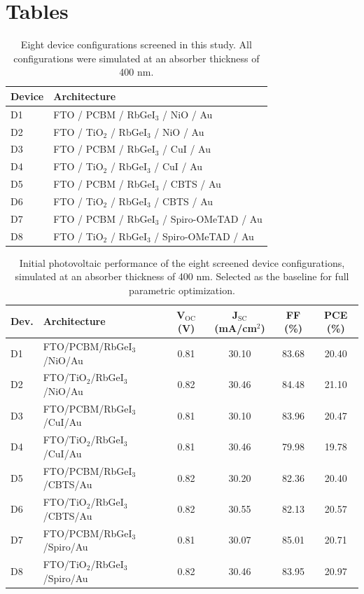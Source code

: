 \documentclass[12pt]{article}
\begin{document}
\section*{Tables}
\begin{table}[htbp]
\centering
{\small\setlength{\tabcolsep}{3pt}
\begin{tabularx}{\textwidth}{XX}
\hline
Device & Architecture
\\\hline
D1 & FTO / PCBM / RbGeI$_{3}$ / NiO / Au\\
D2 & FTO / TiO$_{2}$ / RbGeI$_{3}$ / NiO / Au\\
D3 & FTO / PCBM / RbGeI$_{3}$ / CuI / Au\\
D4 & FTO / TiO$_{2}$ / RbGeI$_{3}$ / CuI / Au\\
D5 & FTO / PCBM / RbGeI$_{3}$ / CBTS / Au\\
D6 & FTO / TiO$_{2}$ / RbGeI$_{3}$ / CBTS / Au\\
D7 & FTO / PCBM / RbGeI$_{3}$ / Spiro-OMeTAD / Au\\
D8 & FTO / TiO$_{2}$ / RbGeI$_{3}$ / Spiro-OMeTAD / Au\\
\hline
\end{tabularx}
}
\caption{Eight device configurations screened in this study. All configurations were simulated at an absorber thickness of 400 nm.}
\end{table}

\begin{table}[htbp]
\centering
{\footnotesize\setlength{\tabcolsep}{3pt}
\begin{tabularx}{\textwidth}{XXcccc}
\hline
Dev. & Architecture & V$_{\mathrm{OC}}$ (V) & J$_{\mathrm{SC}}$ (mA/cm$^{2}$) & FF (\%) & PCE (\%)
\\\hline
D1 & FTO/\allowbreak{}PCBM/\allowbreak{}RbGeI$_{3}$/NiO/\allowbreak{}Au & 0.81 & 30.10 & 83.68 & 20.40\\
D2 & FTO/\allowbreak{}TiO$_{2}$/RbGeI$_{3}$/NiO/\allowbreak{}Au & 0.82 & 30.46 & 84.48 & 21.10\\
D3 & FTO/\allowbreak{}PCBM/\allowbreak{}RbGeI$_{3}$/CuI/\allowbreak{}Au & 0.81 & 30.10 & 83.96 & 20.47\\
D4 & FTO/\allowbreak{}TiO$_{2}$/RbGeI$_{3}$/CuI/\allowbreak{}Au & 0.81 & 30.46 & 79.98 & 19.78\\
D5 & FTO/\allowbreak{}PCBM/\allowbreak{}RbGeI$_{3}$/CBTS/\allowbreak{}Au & 0.82 & 30.20 & 82.36 & 20.40\\
D6 & FTO/\allowbreak{}TiO$_{2}$/RbGeI$_{3}$/CBTS/\allowbreak{}Au & 0.82 & 30.55 & 82.13 & 20.57\\
D7 & FTO/\allowbreak{}PCBM/\allowbreak{}RbGeI$_{3}$/Spiro/Au & 0.81 & 30.07 & 85.01 & 20.71\\
D8 & FTO/\allowbreak{}TiO$_{2}$/RbGeI$_{3}$/Spiro/Au & 0.82 & 30.46 & 83.95 & 20.97\\
\hline
\end{tabularx}
}
\caption{Initial photovoltaic performance of the eight screened device configurations, simulated at an absorber thickness of 400 nm.  Selected as the baseline for full parametric optimization.}
\end{table}
\end{document}
